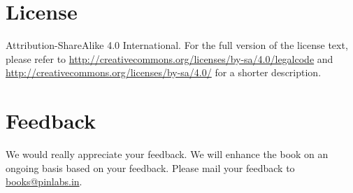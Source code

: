 \section*{License}
Attribution-ShareAlike 4.0 International. For the full version of the license text, please refer to
\url{http://creativecommons.org/licenses/by-sa/4.0/legalcode} and
\url{http://creativecommons.org/licenses/by-sa/4.0/} for a shorter description.

\section*{Feedback}
We would really appreciate your feedback. We will enhance the book on an ongoing basis based on your feedback. Please mail your feedback to 
\href{mailto:books@pinlabs.in}{books@pinlabs.in}.

\vspace{0.25in}
